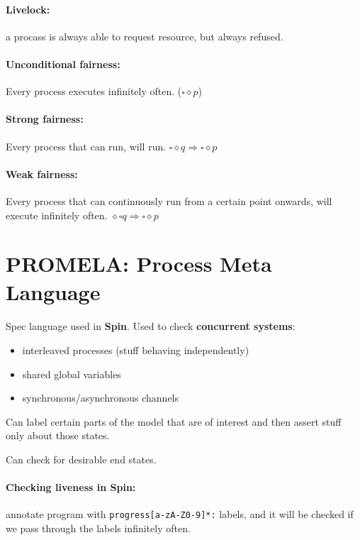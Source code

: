 \documentclass{article}
\begin{document}
\paragraph{Livelock:} a procass is always able to request resource, but always refused.
\paragraph{Unconditional fairness:} Every process executes infinitely often.
($\square\diamond p$)
\paragraph{Strong fairness:} Every process that can run, will run.
$\square\diamond q \Rightarrow \square\diamond p$
\paragraph{Weak fairness:} Every process that can continuously run from a
certain point onwards, will execute infinitely often. $\diamond\square q \Rightarrow \square\diamond p$

\section{PROMELA: Process Meta Language}
\paragraph{}
Spec language used in \textbf{Spin}.
Used to check \textbf{concurrent systems}:
\begin{itemize}
\item interleaved processes (stuff behaving independently)
\item shared global variables
\item synchronous/asynchronous channels
\end{itemize}

Can label certain parts of the model that are of interest and then assert stuff
only about those states.

Can check for desirable end states.

\paragraph{Checking liveness in Spin:} annotate program with
\texttt{progress[a-zA-Z0-9]*:} labels, and it will be checked if we pass through
the labels infinitely often.
\end{document}
